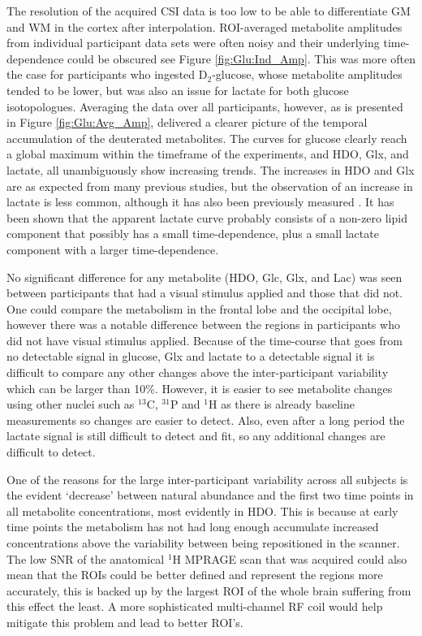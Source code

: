 \documentclass[class=article, crop=false]{standalone}
\begin{document}
The resolution of the acquired CSI data is too low to be able to differentiate GM and WM in the cortex after interpolation. ROI-averaged metabolite amplitudes from individual participant data sets were often noisy and their underlying time-dependence could be obscured see Figure \ref{fig:Glu:Ind_Amp}. This was more often the case for participants who ingested D$_2$-glucose, whose metabolite amplitudes tended to be lower, but was also an issue for lactate for both glucose isotopologues. Averaging the data over all participants, however, as is presented in Figure \ref{fig:Glu:Avg_Amp}, delivered a clearer picture of the temporal accumulation of the deuterated metabolites. The curves for glucose clearly reach a global maximum within the timeframe of the experiments, and HDO, Glx, and lactate, all unambiguously show increasing trends. The increases in HDO and Glx are as expected from many previous studies, but the observation of an increase in lactate is less common, although it has also been previously measured \cite{Ruhm2021DeuteriumResolution, Kaggie2022DeuteriumMetabolism}. It has been shown that the apparent lactate curve probably consists of a non-zero lipid component that possibly has a small time-dependence, plus a small lactate component with a larger time-dependence\cite{Ruhm2021DeuteriumResolution}.     

No significant difference for any metabolite (HDO, Glc, Glx, and Lac) was seen between participants that had a visual stimulus applied and those that did not. One could compare the metabolism in the frontal lobe and the occipital lobe, however there was a notable difference between the regions in participants who did not have visual stimulus applied. Because of the time-course that goes from no detectable signal in glucose, Glx and lactate to a detectable signal it is difficult to compare any other changes above the inter-participant variability which can be larger than 10\%. However, it is easier to see metabolite changes using other nuclei such as $^{13}$C, $^{31}$P and $^1$H as there is already baseline measurements so changes are easier to detect. Also, even after a long period the lactate signal is still difficult to detect and fit, so any additional changes are difficult to detect.  

One of the reasons for the large inter-participant variability across all subjects is the evident ‘decrease’ between natural abundance and the first two time points in all metabolite concentrations, most evidently in HDO. This is because at early time points the metabolism has not had long enough accumulate increased concentrations above the variability between being repositioned in the scanner. The low SNR of the anatomical $^1$H MPRAGE scan that was acquired could also mean that the ROIs could be better defined and represent the regions more accurately, this is backed up by the largest ROI of the whole brain suffering from this effect the least. A more sophisticated multi-channel RF coil would help mitigate this problem and lead to better ROI’s.
\end{document}
